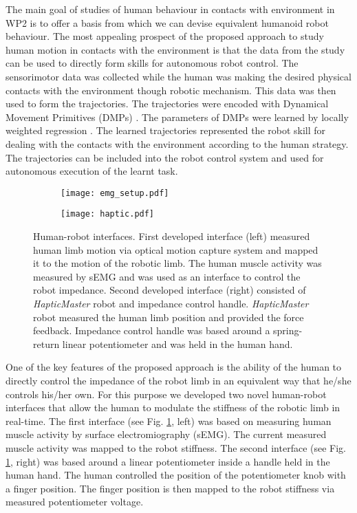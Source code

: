 The main goal of studies of human behaviour in contacts with environment in WP2 is to offer a basis from which we can devise equivalent humanoid robot behaviour. The most appealing prospect of the proposed approach to study human motion in contacts with the environment is that the data from the study can be used to directly form skills for autonomous robot control. The sensorimotor data was collected while the human was making the desired physical contacts with the environment though robotic mechanism. This data was then used to form the trajectories. The trajectories were encoded with Dynamical Movement Primitives (DMPs) \cite{Ijspeert2002}. The parameters of DMPs were learned by locally weighted regression \cite{Schaal1998}. The learned trajectories represented the robot skill for dealing with the contacts with the environment according to the human strategy. The trajectories can be included into the robot control system and used for autonomous execution of the learnt task.
\begin{figure}[!t]
\centering
\begin{subfigure}[b]{0.43\textwidth}
\texttt{[image: emg\_setup.pdf]}
\end{subfigure}
\begin{subfigure}[b]{0.53\textwidth}
\texttt{[image: haptic.pdf]}
\end{subfigure}
\caption{Human-robot interfaces. First developed interface (left) measured human limb motion via optical motion capture system and mapped it to the motion of the robotic limb. The human muscle activity was measured by sEMG and was used as an interface to control the robot impedance. Second developed interface (right) consisted of \textit{HapticMaster} robot and impedance control handle. \textit{HapticMaster} robot measured the human limb position and provided the force feedback. Impedance control handle was based around a spring-return linear potentiometer and was held in the human hand.}
\label{fig:interface}
\end{figure}

One of the key features of the proposed approach is the ability of the human to directly control the impedance of the robot limb in an equivalent way that he/she controls his/her own. For this purpose we developed two novel human-robot interfaces \cite{Peternel2014,Peternel2015} that allow the human to modulate the stiffness of the robotic limb in real-time. The first interface (see Fig. \ref{fig:interface}, left) was based on measuring human muscle activity by surface electromiography (sEMG). The current measured muscle activity was mapped to the robot stiffness. The second interface (see Fig. \ref{fig:interface}, right) was based around a linear potentiometer inside a handle held in the human hand. The human controlled the position of the potentiometer knob with a finger position. The finger position is then mapped to the robot stiffness via measured potentiometer voltage.








